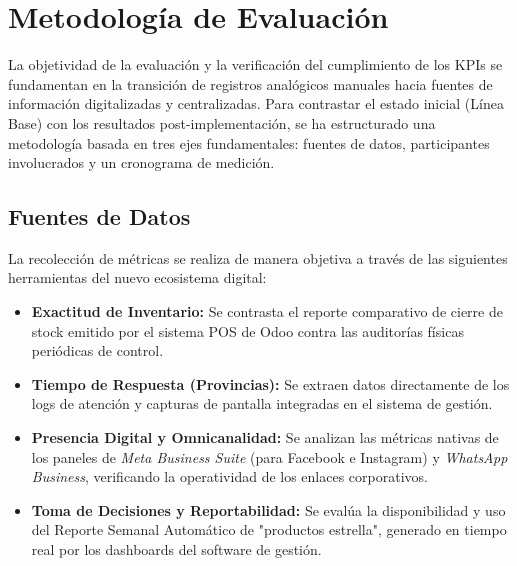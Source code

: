 \section{Metodología de Evaluación}

La objetividad de la evaluación y la verificación del cumplimiento de los KPIs se fundamentan en la transición de registros analógicos manuales hacia fuentes de información digitalizadas y centralizadas. Para contrastar el estado inicial (Línea Base) con los resultados post-implementación, se ha estructurado una metodología basada en tres ejes fundamentales: fuentes de datos, participantes involucrados y un cronograma de medición.

\subsection{Fuentes de Datos}
La recolección de métricas se realiza de manera objetiva a través de las siguientes herramientas del nuevo ecosistema digital:
\begin{itemize}
    \item \textbf{Exactitud de Inventario:} Se contrasta el reporte comparativo de cierre de stock emitido por el sistema POS de Odoo contra las auditorías físicas periódicas de control.
    \item \textbf{Tiempo de Respuesta (Provincias):} Se extraen datos directamente de los logs de atención y capturas de pantalla integradas en el sistema de gestión.
    \item \textbf{Presencia Digital y Omnicanalidad:} Se analizan las métricas nativas de los paneles de \textit{Meta Business Suite} (para Facebook e Instagram) y \textit{WhatsApp Business}, verificando la operatividad de los enlaces corporativos.
    \item \textbf{Toma de Decisiones y Reportabilidad:} Se evalúa la disponibilidad y uso del Reporte Semanal Automático de "productos estrella", generado en tiempo real por los dashboards del software de gestión.
\end{itemize}

